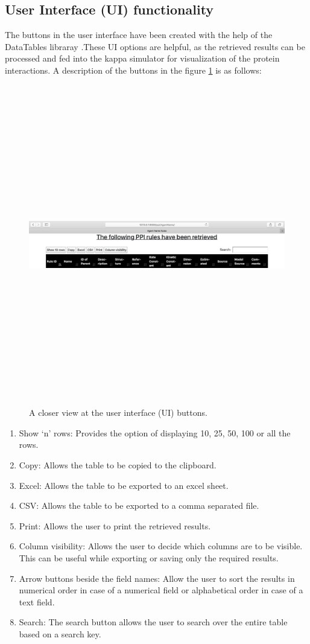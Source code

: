 \documentclass[msc,deptreport,ai]{infthesis}      %
\begin{document}
\subsection {User Interface (UI) functionality}
The buttons in the user interface have been created with the help of the DataTables libraray \cite{dataTables}.These UI options are helpful, as the retrieved results can be processed and fed into the  kappa simulator for visualization of the protein interactions. A description of the buttons in the figure \ref{fig:UI} is as follows:
\begin{figure}[H]
	\centering
	\captionsetup{justification=centering}
	\includegraphics[width=\linewidth,height=14cm,keepaspectratio]{UI.png}	
	\caption{A closer view at the user interface (UI) buttons.}
	\label{fig:UI}		
\end{figure}
\begin{enumerate}
	\item Show `n' rows: Provides the option of displaying 10, 25, 50, 100 or all the rows.
	\item Copy: Allows the table to be copied to the clipboard.
	\item Excel: Allows the table to be exported to an excel sheet.
	\item CSV: Allows the table to be exported to a comma separated file.
	\item Print: Allows the user to print the retrieved results.
	\item Column visibility: Allows the user to decide which columns are to be visible. This can be useful while exporting or saving only the required results.
	\item Arrow buttons beside the field names: Allow the user to sort the results in numerical order in case of a numerical field or alphabetical order in case of a text field.
	\item Search: The search button allows the user to search over the entire table based on a search key.
\end{enumerate}
\end{document}
